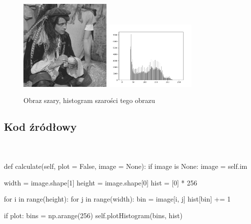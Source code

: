 \documentclass[final,a4paper,openany,12pt]{mwbk}
\begin{document}
\begin{figure}[H]
	\begin{center}
		\includegraphics[width=0.4\textwidth]{pirate_gray}
		\includegraphics[width=0.4\textwidth]{pirate_gray_histogram}
	\end{center}
	\caption{Obraz szary, histogram szarości tego obrazu}
\end{figure}
\newpage

\subsection*{Kod źródłowy}
\hfill
\\\\
\noindent def calculate(self, plot = False, image = None): \newline
\indent if image is None: \newline
\indent image = self.im \newline

width = image.shape[1] \newline
\indent height = image.shape[0] \newline
\indent hist = [0] * 256 \newline

for i in range(height): \newline
\indent for j in range(width): \newline
\indent bin = image[i, j] \newline
\indent hist[bin] += 1 \newline

if plot: \newline
\indent bins = np.arange(256) \newline
\indent self.plotHistogram(bins, hist) \newline
\end{document}
